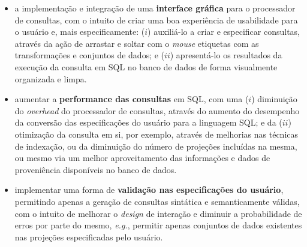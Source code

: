 \begin{itemize}
    \item a implementação e integração de uma \textbf{interface gráfica} para o processador de consultas, com o intuito de criar uma boa experiência de usabilidade para o usuário e, mais especificamente: (\(i\)) auxiliá-lo a criar e especificar consultas, através da ação de arrastar e soltar com o \textit{mouse} etiquetas com as transformações e conjuntos de dados; e (\(ii\)) apresentá-lo os resultados da execução da consulta em SQL no banco de dados de forma visualmente organizada e limpa.
    \item aumentar a \textbf{performance das consultas} em SQL, com uma (\(i\)) diminuição do \textit{overhead} do processador de consultas, através do aumento do desempenho da conversão das especificações do usuário para a linguagem SQL; e da (\(ii\)) otimização da consulta em si, por exemplo, através de melhorias nas técnicas de indexação, ou da diminuição do número de projeções incluídas na mesma, ou mesmo via um melhor aproveitamento das informações e dados de proveniência disponíveis no banco de dados.
    \item implementar uma forma de \textbf{validação nas especificações do usuário}, permitindo apenas a geração de consultas sintática e semanticamente válidas, com o intuito de melhorar o \textit{design} de interação e diminuir a probabilidade de erros por parte do mesmo, \textit{e.g.}, permitir apenas conjuntos de dados existentes nas projeções especificadas pelo usuário.
\end{itemize}
